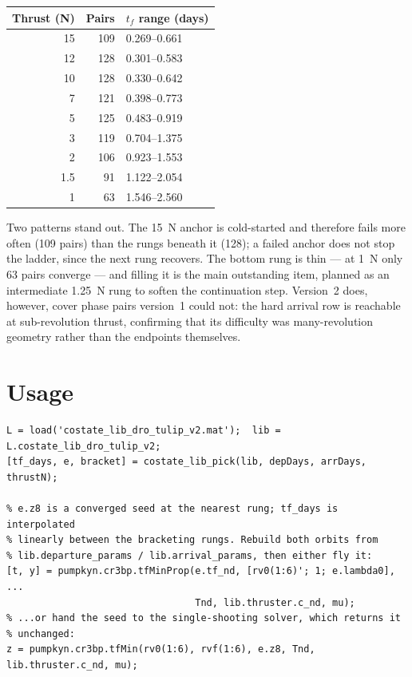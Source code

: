 \documentclass[11pt]{article}
\begin{document}
\begin{center}
\begin{tabular}{rrl}
\toprule
\textbf{Thrust (N)} & \textbf{Pairs} & \textbf{$t_f$ range (days)} \\
\midrule
15   & 109 & 0.269--0.661 \\
12   & 128 & 0.301--0.583 \\
10   & 128 & 0.330--0.642 \\
7    & 121 & 0.398--0.773 \\
5    & 125 & 0.483--0.919 \\
3    & 119 & 0.704--1.375 \\
2    & 106 & 0.923--1.553 \\
1.5  &  91 & 1.122--2.054 \\
1    &  63 & 1.546--2.560 \\
\bottomrule
\end{tabular}
\end{center}

Two patterns stand out. The 15~N anchor is cold-started and therefore fails
more often (109 pairs) than the rungs beneath it (128); a failed anchor does
not stop the ladder, since the next rung recovers. The bottom rung is thin ---
at 1~N only 63 pairs converge --- and filling it is the main outstanding item,
planned as an intermediate 1.25~N rung to soften the continuation step.
Version~2 does, however, cover phase pairs version~1 could not: the hard
arrival row is reachable at sub-revolution thrust, confirming that its
difficulty was many-revolution geometry rather than the endpoints themselves.

\section{Usage}

\begin{verbatim}
L = load('costate_lib_dro_tulip_v2.mat');  lib = L.costate_lib_dro_tulip_v2;
[tf_days, e, bracket] = costate_lib_pick(lib, depDays, arrDays, thrustN);

% e.z8 is a converged seed at the nearest rung; tf_days is interpolated
% linearly between the bracketing rungs. Rebuild both orbits from
% lib.departure_params / lib.arrival_params, then either fly it:
[t, y] = pumpkyn.cr3bp.tfMinProp(e.tf_nd, [rv0(1:6)'; 1; e.lambda0], ...
                                 Tnd, lib.thruster.c_nd, mu);
% ...or hand the seed to the single-shooting solver, which returns it
% unchanged:
z = pumpkyn.cr3bp.tfMin(rv0(1:6), rvf(1:6), e.z8, Tnd, lib.thruster.c_nd, mu);
\end{verbatim}
\end{document}
